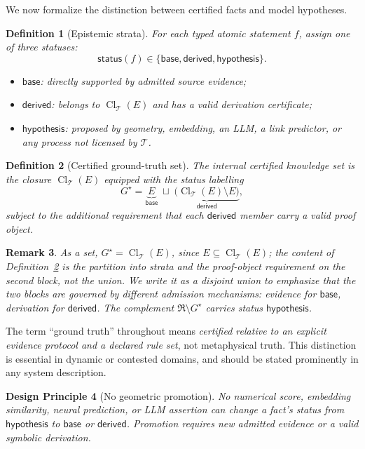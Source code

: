 \documentclass[11pt]{article}
\newtheorem{definition}{Definition}[section]
\newtheorem{remark}[definition]{Remark}
\newtheorem{principle}[definition]{Design Principle}
\newcommand{\Cl}{\operatorname{Cl}}
\newcommand{\T}{\mathcal{T}}
\begin{document}
We now formalize the distinction between certified facts and model hypotheses.

\begin{definition}[Epistemic strata]
For each typed atomic statement $f$, assign one of three statuses:
\[
\mathsf{status}(f)\in\{\mathsf{base},\mathsf{derived},\mathsf{hypothesis}\}.
\]
\begin{itemize}
    \item $\mathsf{base}$: directly supported by admitted source evidence;
    \item $\mathsf{derived}$: belongs to $\Cl_{\T}(E)$ and has a valid derivation certificate;
    \item $\mathsf{hypothesis}$: proposed by geometry, embedding, an LLM, a link predictor, or any process not licensed by $\T$.
\end{itemize}
\end{definition}

\begin{definition}[Certified ground-truth set]
\label{def:gstar}
The internal certified knowledge set is the closure $\Cl_{\T}(E)$ equipped with the status labelling
\[
G^{\star}=\underbrace{E}_{\mathsf{base}}\;\sqcup\;\underbrace{\bigl(\Cl_{\T}(E)\setminus E\bigr)}_{\mathsf{derived}},
\]
subject to the additional requirement that each $\mathsf{derived}$ member carry a valid proof object.
\end{definition}

\begin{remark}
As a set, $G^{\star}=\Cl_{\T}(E)$, since $E\subseteq\Cl_{\T}(E)$; the content of Definition~\ref{def:gstar} is the \emph{partition} into strata and the proof-object requirement on the second block, not the union. We write it as a disjoint union to emphasize that the two blocks are governed by different admission mechanisms: evidence for $\mathsf{base}$, derivation for $\mathsf{derived}$. The complement $\mathfrak{R}\setminus G^{\star}$ carries status $\mathsf{hypothesis}$.
\end{remark}

The term ``ground truth'' throughout means \emph{certified relative to an explicit evidence protocol and a declared rule set}, not metaphysical truth. This distinction is essential in dynamic or contested domains, and should be stated prominently in any system description.

\begin{principle}[No geometric promotion]
\label{prin:no-promotion}
No numerical score, embedding similarity, neural prediction, or LLM assertion can change a fact's status from $\mathsf{hypothesis}$ to $\mathsf{base}$ or $\mathsf{derived}$. Promotion requires new admitted evidence or a valid symbolic derivation.
\end{principle}
\end{document}
